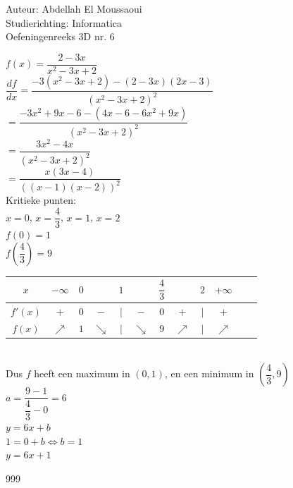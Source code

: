 \documentclass[a4paper]{article}
\begin{document}
  
\noindent \large Auteur: Abdellah El Moussaoui \\
\noindent \large Studierichting: Informatica\\
\noindent \large Oefeningenreeks 3D nr. 6\\

\medskip

\normalsize

$f\left(x\right) = \dfrac{2 - 3x}{x^2 - 3x + 2}$ \\

$\dfrac{df}{dx} = \dfrac{-3\left(x^2-3x+2\right) - \left(2-3x\right)\left(2x-3\right)}{\left(x^2-3x+2\right)^2}$ \\

$ = \dfrac{-3x^2 + 9x -6-\left(4x-6-6x^2+9x\right)}{\left(x^2-3x+2\right)^2}$ \\

$ = \dfrac{3x^2 -4x}{\left(x^2-3x+2\right)^2}$ \\

$ = \dfrac{x\left(3x - 4\right)}{\left(\left(x-1\right)\left(x-2\right)\right)^2}$ \\

Kritieke punten:\\

$x=0$, $x=\dfrac{4}{3}$, $x=1$, $x=2$ \\

$f\left(0\right) = 1$ \\

$f\left(\dfrac{4}{3}\right) = 9$ \\

\begin{tabular}{c|ccccccccccc}
        $x$     & $-\infty$ & $0$ & & $1$ & & $\dfrac{4}{3}$ &  & $2$ & $+\infty$\\ 
        \hline
        $f'(x)$ & $+$       & $0$ & $-$ & $|$ & $-$ & $0$ & $+$ & $|$ &  $+$ \\ 
        \hline
        $f(x)$ & $\nearrow$       & $1$ & $\searrow$ & $|$ & $\searrow$ & $9$ & $\nearrow$ & $|$ &  $\nearrow$ \\ 
\end{tabular}\\

Dus $f$ heeft een maximum in $\left(0,1\right)$, en een minimum in $\left(\dfrac{4}{3},9\right)$ \\

$a = \dfrac{9 -1}{\dfrac{4}{3} - 0} = 6$ \\

$y = 6x + b$ \\

$1 = 0 + b \Leftrightarrow b = 1$ \\

$\boxed{y = 6x + 1}$\\

\begin{thebibliography}{999}
\end{thebibliography}
\end{document}
